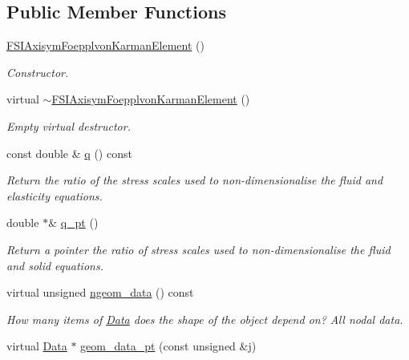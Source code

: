 \subsection*{Public Member Functions}
\begin{DoxyCompactItemize}
\item 
\hyperlink{classoomph_1_1FSIAxisymFoepplvonKarmanElement_ad81be06021aa008d04f805ed17900656}{F\+S\+I\+Axisym\+Foepplvon\+Karman\+Element} ()
\begin{DoxyCompactList}\small\item\em Constructor. \end{DoxyCompactList}\item 
virtual \hyperlink{classoomph_1_1FSIAxisymFoepplvonKarmanElement_a27c344167ea99ac58d4212d871ae3af7}{$\sim$\+F\+S\+I\+Axisym\+Foepplvon\+Karman\+Element} ()
\begin{DoxyCompactList}\small\item\em Empty virtual destructor. \end{DoxyCompactList}\item 
const double \& \hyperlink{classoomph_1_1FSIAxisymFoepplvonKarmanElement_aa7ac9f6e82b6890030a739665ec1f63a}{q} () const
\begin{DoxyCompactList}\small\item\em Return the ratio of the stress scales used to non-\/dimensionalise the fluid and elasticity equations. \end{DoxyCompactList}\item 
double $\ast$\& \hyperlink{classoomph_1_1FSIAxisymFoepplvonKarmanElement_ad348cd2e740d5bf8ca88c1f8409bd27f}{q\+\_\+pt} ()
\begin{DoxyCompactList}\small\item\em Return a pointer the ratio of stress scales used to non-\/dimensionalise the fluid and solid equations. \end{DoxyCompactList}\item 
virtual unsigned \hyperlink{classoomph_1_1FSIAxisymFoepplvonKarmanElement_ad3b508a8c906a3e175f9c058a0103023}{ngeom\+\_\+data} () const
\begin{DoxyCompactList}\small\item\em How many items of \hyperlink{classoomph_1_1Data}{Data} does the shape of the object depend on? All nodal data. \end{DoxyCompactList}\item 
virtual \hyperlink{classoomph_1_1Data}{Data} $\ast$ \hyperlink{classoomph_1_1FSIAxisymFoepplvonKarmanElement_a4aa016e0164dad96f66ff98af98889e6}{geom\+\_\+data\+\_\+pt} (const unsigned \&j)

\end{DoxyCompactItemize}
